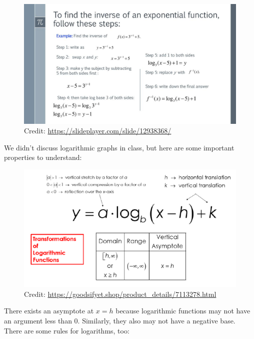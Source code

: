 \documentclass[12pt]{article}
\begin{document}
\begin{figure}[H]
	\centering
	\includegraphics[scale=1.75]{expinv.jpg}
	\caption{Credit: \url{https://slideplayer.com/slide/12938368/}}
\end{figure}


We didn't discuss logarithmic graphs in class, but here are some important properties to understand:\\

\begin{figure}[H]
	\centering
	\includegraphics[scale=.45]{loggraph.png}
	\caption{Credit: \url{https://goodsifyet.shop/product_details/7113278.html}}
\end{figure}

There exists an asymptote at \(x=h\) because logarithmic functions may not have an argument less than 0. Similarly, they also may not have a negative base.\\

There are some rules for logarithms, too:\\
\end{document}
